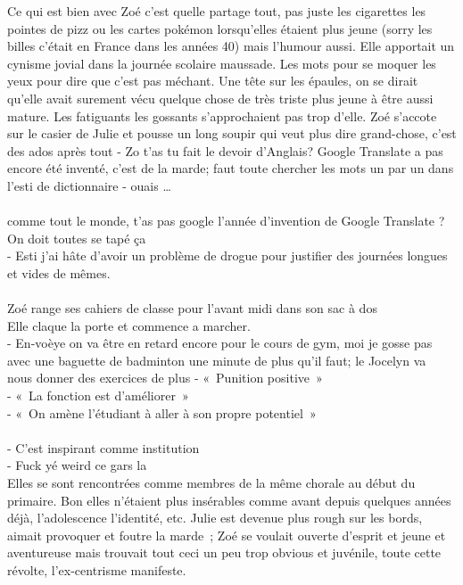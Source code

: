 Ce qui est bien avec Zoé c’est quelle partage tout, pas juste les cigarettes
les pointes de pizz ou les cartes pokémon lorsqu’elles étaient plus jeune
(sorry les billes c’était en France dans les années 40) mais l’humour aussi.
Elle apportait un cynisme jovial dans la journée scolaire maussade. Les mots
pour se moquer les yeux pour dire que c’est pas méchant.  Une tête sur les
épaules, on se dirait qu’elle avait surement vécu quelque chose de très triste
plus jeune à être aussi mature. Les fatiguants les gossants s’approchaient pas
trop d’elle. Zoé s’accote sur le casier de Julie et pousse un long soupir qui
veut plus dire grand-chose, c’est des ados après tout - Zo t’as tu fait le
devoir d’Anglais? Google Translate a pas encore été inventé, c’est de la marde;
faut toute chercher les mots un par un dans l’esti de dictionnaire
- ouais …\\\\
	comme tout le monde, t’as pas google l’année d’invention de Google 	Translate	? On doit toutes se tapé ça \\
- Esti j’ai hâte d’avoir un problème de drogue pour justifier des journées longues et vides de mêmes.\\
\\
Zoé range ses cahiers de classe pour l’avant midi dans son sac à dos \\
Elle claque la porte et commence a marcher.\\
- En-voèye on va être en retard encore pour le cours de gym, moi je gosse pas\\
avec une baguette de badminton une minute de plus qu’il faut; le Jocelyn va\\
nous donner des exercices de plus - « Punition positive »\\
- « La fonction est d’améliorer »\\
- « On amène l’étudiant à aller à son propre potentiel »\\
\\
- C’est inspirant comme institution\\
- Fuck yé weird ce gars la\\



Elles se sont rencontrées comme membres de la même chorale au début du
primaire. Bon elles n’étaient plus insérables comme avant depuis quelques
années déjà, l’adolescence l’identité, etc. Julie est devenue plus rough sur
les bords, aimait provoquer et foutre la marde ; Zoé se voulait ouverte
d’esprit et jeune et aventureuse mais trouvait tout ceci un peu trop obvious et
juvénile, toute cette révolte, l’ex-centrisme manifeste.
